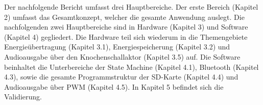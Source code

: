 Der nachfolgende Bericht umfasst drei Hauptbereiche. Der erste Bereich (Kapitel 2) umfasst das Gesamtkonzept, welcher die gesamte Anwendung auslegt. Die nachfolgenden zwei Hauptbereiche sind in Hardware (Kapitel 3) und Software (Kapitel 4) gegliedert. Die Hardware teil sich wiederum in die Themengebiete Energieübertragung (Kapitel 3.1), Energiespeicherung (Kapitel 3.2) und Audioausgabe über den Knochenschallaktor (Kapitel 3.5) auf. Die Software beinhaltet die Unterbereiche der State Machine (Kapitel 4.1), Bluetooth (Kapitel 4.3), sowie die gesamte Programmstruktur der SD-Karte (Kapitel 4.4) und Audioausgabe über PWM (Kapitel 4.5). In Kapitel 5 befindet sich die Validierung. 